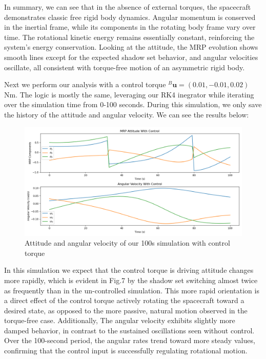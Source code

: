 \documentclass[conf]{new-aiaa}
\begin{document}
In summary, we can see that in the absence of external torques, the spacecraft demonstrates classic free rigid body dynamics. Angular momentum is conserved in the inertial frame, while its components in the rotating body frame vary over time. The rotational kinetic energy remains essentially constant, reinforcing the system's energy conservation. Looking at the attitude, the MRP evolution shows smooth lines except for the expected shadow set behavior, and angular velocities oscillate, all consistent with torque-free motion of an asymmetric rigid body.

Next we perform our analysis with a control torque ${}^B\bm u = (0.01, -0.01, 0.02)$ Nm. The logic is mostly the same, leveraging our RK4 inegrator while iterating over the simulation time from 0-100 seconds. During this simulation, we only save the history of the attitude and angular velocity. We can see the results below:
\begin{figure}[H]
    \centering
    \captionsetup{width=.7\linewidth}
    \includegraphics[width=1\linewidth]{task7_with_control.png}
    \caption{Attitude and angular velocity of our 100s simulation with control torque}
    \label{fig:enter-label}
\end{figure}
In this simulation we expect that the control torque is driving attitude changes more rapidly, which is evident in Fig.7 by the shadow set switching almost twice as frequently than in the un-controlled simulation. This more rapid orientation is a direct effect of the control torque actively rotating the spacecraft toward a desired state, as opposed to the more passive, natural motion observed in the torque-free case. Additionally, The angular velocity exhibits slightly more damped behavior, in contrast to the sustained oscillations seen without control. Over the 100-second period, the angular rates trend toward more steady values, confirming that the control input is successfully regulating rotational motion.
\end{document}
